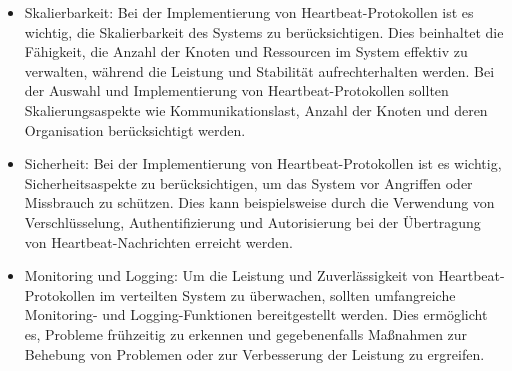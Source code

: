 \documentclass[../vs-script-first-v01.tex]{subfiles}
\begin{document}
\begin{itemize}
\item Skalierbarkeit: Bei der Implementierung von Heartbeat-Protokollen ist es wichtig, die Skalierbarkeit des Systems zu berücksichtigen. Dies beinhaltet die Fähigkeit, die Anzahl der Knoten und Ressourcen im System effektiv zu verwalten, während die Leistung und Stabilität aufrechterhalten werden. Bei der Auswahl und Implementierung von Heartbeat-Protokollen sollten Skalierungsaspekte wie Kommunikationslast, Anzahl der Knoten und deren Organisation berücksichtigt werden.
\item Sicherheit: Bei der Implementierung von Heartbeat-Protokollen ist es wichtig, Sicherheitsaspekte zu berücksichtigen, um das System vor Angriffen oder Missbrauch zu schützen. Dies kann beispielsweise durch die Verwendung von Verschlüsselung, Authentifizierung und Autorisierung bei der Übertragung von Heartbeat-Nachrichten erreicht werden.
\item Monitoring und Logging: Um die Leistung und Zuverlässigkeit von Heartbeat-Protokollen im verteilten System zu überwachen, sollten umfangreiche Monitoring- und Logging-Funktionen bereitgestellt werden. Dies ermöglicht es, Probleme frühzeitig zu erkennen und gegebenenfalls Maßnahmen zur Behebung von Problemen oder zur Verbesserung der Leistung zu ergreifen.
\end{itemize} 
\end{document}

